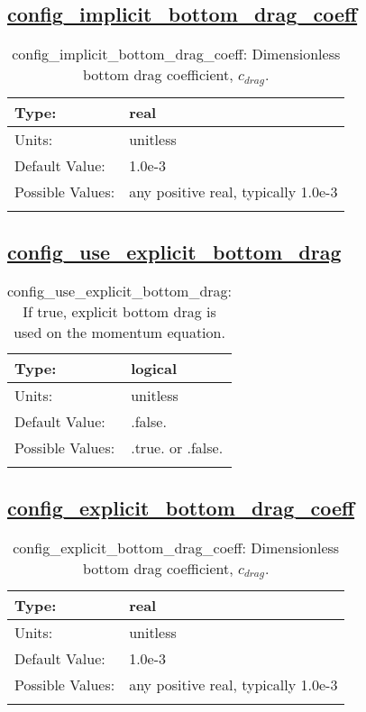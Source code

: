 \subsection[config\_implicit\_bottom\_drag\_coeff]{\hyperref[sec:nm_tab_bottom_drag]{config\_implicit\_bottom\_drag\_coeff}}
\label{subsec:nm_sec_config_implicit_bottom_drag_coeff}
\begin{center}
\begin{longtable}{| p{2.0in} || p{4.0in} |}
    \hline
    Type: & real \\
    \hline
    Units: & \si{unitless} \\
    \hline
    Default Value: & 1.0e-3 \\
    \hline
    Possible Values: & any positive real, typically 1.0e-3 \\
    \hline
    \caption{config\_implicit\_bottom\_drag\_coeff: Dimensionless bottom drag coefficient, $c_{drag}$.}
\end{longtable}
\end{center}
\subsection[config\_use\_explicit\_bottom\_drag]{\hyperref[sec:nm_tab_bottom_drag]{config\_use\_explicit\_bottom\_drag}}
\label{subsec:nm_sec_config_use_explicit_bottom_drag}
\begin{center}
\begin{longtable}{| p{2.0in} || p{4.0in} |}
    \hline
    Type: & logical \\
    \hline
    Units: & \si{unitless} \\
    \hline
    Default Value: & .false. \\
    \hline
    Possible Values: & .true. or .false. \\
    \hline
    \caption{config\_use\_explicit\_bottom\_drag: If true, explicit bottom drag is used on the momentum equation.}
\end{longtable}
\end{center}
\subsection[config\_explicit\_bottom\_drag\_coeff]{\hyperref[sec:nm_tab_bottom_drag]{config\_explicit\_bottom\_drag\_coeff}}
\label{subsec:nm_sec_config_explicit_bottom_drag_coeff}
\begin{center}
\begin{longtable}{| p{2.0in} || p{4.0in} |}
    \hline
    Type: & real \\
    \hline
    Units: & \si{unitless} \\
    \hline
    Default Value: & 1.0e-3 \\
    \hline
    Possible Values: & any positive real, typically 1.0e-3 \\
    \hline
    \caption{config\_explicit\_bottom\_drag\_coeff: Dimensionless bottom drag coefficient, $c_{drag}$.}
\end{longtable}
\end{center}
